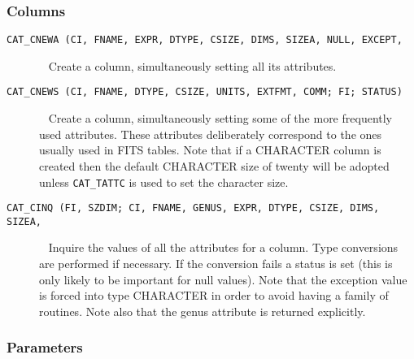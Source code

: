 \subsubsection{\label{SUBINT_COL}Columns}

\begin{description}

  \item[ {\tt CAT\_CNEWA (CI, FNAME, EXPR, DTYPE,
   CSIZE, DIMS, SIZEA, NULL, EXCEPT, } ] ~
  \newline Create a column, simultaneously setting all its attributes.

  \item[ {\tt CAT\_CNEWS (CI, FNAME, DTYPE, CSIZE, UNITS, EXTFMT, COMM;
   FI; STATUS)} ] ~
  \newline Create a column, simultaneously setting some of the more
   frequently used attributes. These attributes deliberately correspond
   to the ones usually used in FITS tables. Note that if a CHARACTER
   column is created then the default CHARACTER size of twenty will be
   adopted unless {\tt CAT\_TATTC} is used to set the character size.

  \item[ {\tt CAT\_CINQ (FI, SZDIM; CI, FNAME, GENUS, EXPR, DTYPE,
   CSIZE, DIMS, SIZEA, } ] ~
  \newline Inquire the values of all the attributes for a column. Type
   conversions are performed if necessary. If the conversion fails a
   status is set (this is only likely to be important for null values).
   Note that the exception value is forced into type CHARACTER in order
   to avoid having a family of routines. Note also that the genus
   attribute is returned explicitly.

\end{description}

\subsubsection{\label{SUBINT_PAR}Parameters}

